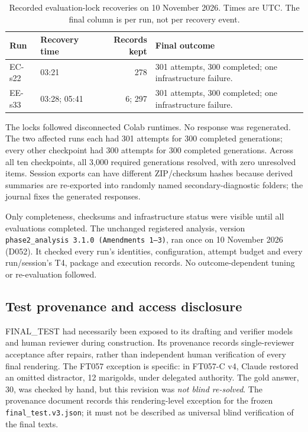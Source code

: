 \begin{table}[H]
\centering\small\singlespacing
\caption{Recorded evaluation-lock recoveries on 10 November 2026. Times are UTC. The final column is per run, not per recovery event.}
\label{tab:phase2-recoveries}
\begin{tabularx}{\linewidth}{@{}llrL@{}}
\toprule
Run & Recovery time & Records kept & Final outcome\\
\midrule
EC-s22 & 03:21 & 278 & 301 attempts, 300 completed; one infrastructure failure.\\
EE-s33 & 03:28; 05:41 & 6; 297 & 301 attempts, 300 completed; one infrastructure failure.\\
\bottomrule
\end{tabularx}
\end{table}

The locks followed disconnected Colab runtimes. No response was regenerated. The two affected runs each had 301 attempts for 300 completed generations; every other checkpoint had 300 attempts for 300 completed generations. Across all ten checkpoints, all 3,000 required generations resolved, with zero unresolved items. Session exports can have different ZIP/checksum hashes because derived summaries are re-exported into randomly named secondary-diagnostic folders; the journal fixes the generated responses.

Only completeness, checksums and infrastructure status were visible until all evaluations completed. The unchanged registered analysis, version \texttt{phase2\_analysis 3.1.0 (Amendments 1--3)}, ran once on 10 November 2026 (D052). It checked every run's identities, configuration, attempt budget and every run/session's T4, package and execution records. No outcome-dependent tuning or re-evaluation followed.

\subsection{Test provenance and access disclosure}
FINAL\_TEST had necessarily been exposed to its drafting and verifier models and human reviewer during construction. Its provenance records single-reviewer acceptance after repairs, rather than independent human verification of every final rendering. The FT057 exception is specific: in FT057-C v4, Claude restored an omitted distractor, 12 marigolds, under delegated authority. The gold answer, 30, was checked by hand, but this revision was \emph{not blind re-solved}. The provenance document records this rendering-level exception for the frozen \texttt{final\_test.v3.json}; it must not be described as universal blind verification of the final texts.

